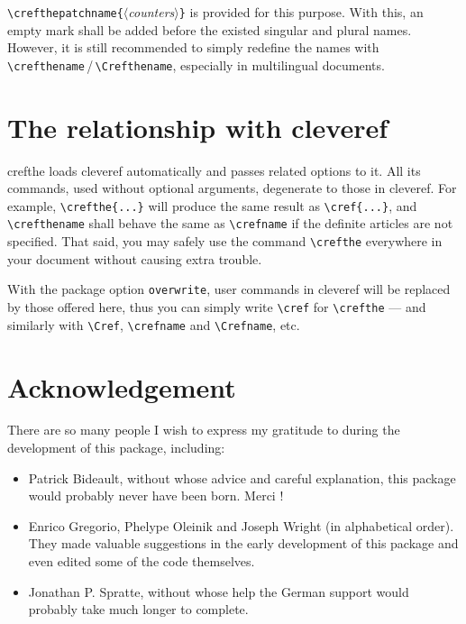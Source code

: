 \documentclass[classical]{einfart}
\newcommand{\meta}[1]{$\langle${\normalfont\itshape#1}$\rangle$}
\newcommand{\packageoption}[1]{\texttt{\textcolor{code-option}{#1}}}
\newcommand{\crefthepackage}{\textsf{crefthe}}
\begin{document}
\lstinline|\crefthepatchname{|\meta{counters}\lstinline|}| is provided for this purpose. With this, an empty mark shall be added before the existed singular and plural names. However, it is still recommended to simply redefine the names with \lstinline|\crefthename|\,/\,\lstinline|\Crefthename|, especially in multilingual documents.



\section{The relationship with \textsf{cleveref}}

\crefthepackage{} loads \textsf{cleveref} automatically and passes related options to it. All its commands, used without optional arguments, degenerate to those in \textsf{cleveref}. For example, \lstinline|\crefthe{...}|%
will produce the same result as \lstinline|\cref{...}|, and \lstinline|\crefthename| shall behave the same as \lstinline|\crefname| if the definite articles are not specified. That said, you may safely use the command \lstinline|\crefthe| everywhere in your document without causing extra trouble.

With the package option \packageoption{overwrite}, user commands in \textsf{cleveref} will be replaced by those offered here, thus you can simply write \lstinline|\cref| for \lstinline|\crefthe| --- and similarly with \lstinline|\Cref|, \lstinline|\crefname| and \lstinline|\Crefname|, etc.


\clearpage


\section{Acknowledgement}

There are so many people I wish to express my gratitude to during the development of this package, including:

\begin{itemize}
    \item Patrick Bideault, without whose advice and careful explanation, this package would probably never have been born. Merci !
    \item Enrico Gregorio, Phelype Oleinik and Joseph Wright (in alphabetical order). They made valuable suggestions in the early development of this package and even edited some of the code themselves.
    \item Jonathan P. Spratte, without whose help the German support would probably take much longer to complete.
\end{itemize}
\end{document}
